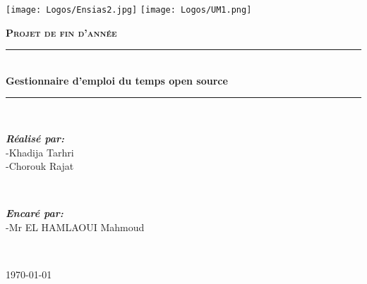 
\thispagestyle{empty}
\texttt{[image: Logos/Ensias2.jpg]}
\hspace{9cm}
\texttt{[image: Logos/UM1.png]}

\vspace{3cm}
\begin{center}
{\large \textsc{\textbf{Projet de fin d'année}}}\\[0.1cm]
\vspace{-0.04cm}
\rule{\linewidth}{0.3mm} \\[0.6cm]   %
 { \huge \textbf{ Gestionnaire d'emploi du temps open source }} \\[0.15cm] 
\rule{\linewidth}{0.3mm} \\[0.6cm]
\vspace{8cm}

        \begin{minipage}{0.5\textwidth}
		\begin{flushleft} \large 
		\emph{\textbf{Réalisé par:}}\\ 
        -Khadija Tarhri  \\ -Chorouk Rajat 
		\end{flushleft}
	\end{minipage}
	~
	\begin{minipage}{0.4\textwidth}
		\begin{flushright} \large
		\emph{\textbf{Encaré par:}} \\
		 -Mr EL HAMLAOUI Mahmoud 
  
		\end{flushright}
	\end{minipage}\\[2cm]
    
	\vfill
	{\large \today\par}
\vspace{6cm}
\end{center}


